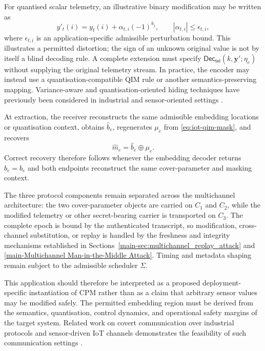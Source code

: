\documentclass[journal]{IEEEtran}
\theoremstyle{definition}
\theoremstyle{game}
\begin{document}
For quantised scalar telemetry, an illustrative binary
modification may be written as
\begin{equation}
\label{eq:iot-embed}
y'_t(i)
=
y_t(i)
+
\alpha_{t,i}(-1)^{b_j},
\qquad
|\alpha_{t,i}|
\leq
\epsilon_{t,i},
\end{equation}
where $\epsilon_{t,i}$ is an application-specific admissible
perturbation bound. This illustrates a permitted distortion; the sign of an unknown original
value is not by itself a blind decoding rule. A complete extension must
specify $\mathsf{Dec}_{\mathsf{tel}}(k,\mathbf y';\eta_e)$ without supplying
the original telemetry stream. In practice, the encoder may instead use a
quantisation-compatible QIM rule or another semantics-preserving
mapping. Variance-aware and quantisation-oriented hiding
techniques have previously been considered in industrial and
sensor-oriented settings
\cite{bairagi2016efficient,huang2018vq}.

At extraction, the receiver reconstructs the same admissible
embedding locations or quantisation context, obtains
$\widehat b_e$, regenerates $\mu_e$ from
\eqref{eq:iot-qim-mask}, and recovers
\begin{equation}
\widehat m_e
=
\widehat b_e\oplus\mu_e.
\end{equation}
Correct recovery therefore follows whenever the embedding decoder
returns $\widehat b_e=b_e$ and both endpoints reconstruct the same
cover-parameter and masking context.

The three protocol components remain separated across the
multichannel architecture: the two cover-parameter objects are
carried on $C_1$ and $C_2$, while the modified telemetry or other
secret-bearing carrier is transported on $C_3$. The complete epoch
is bound by the authenticated transcript, so modification,
cross-channel substitution, or replay is handled by the
freshness and integrity mechanisms established in
Sections~\ref{main-sec:multichannel_replay_attack} and
\ref{main-Multichannel Man-in-the-Middle Attack}. Timing and
metadata shaping remain subject to the admissible scheduler
$\Sigma$.

This application should therefore be interpreted as a
proposed deployment-specific instantiation of CPM rather than as a claim
that arbitrary sensor values may be modified safely. The
permitted embedding region must be derived from the semantics,
quantisation, control dynamics, and operational safety margins of
the target system. Related work on covert communication over
industrial protocols and sensor-driven IoT channels demonstrates
the feasibility of such communication settings
\cite{Hildebrandt2020Information,Koptyra2022Steganography}.
\end{document}
